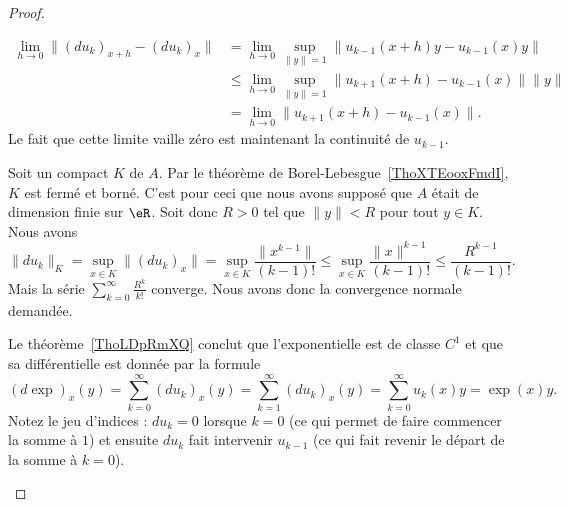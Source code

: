 \begin{proof}
\begin{subproof}
		\begin{subequations}
			\begin{align}
				\lim_{h\to 0} \| (du_k)_{x+h}-(du_k)_x \| & =\lim_{h\to 0} \sup_{\| y \|=1}\| u_{k-1}(x+h)y-u_{k-1}(x)y \|         \\
				                                          & \leq\lim_{h\to 0} \sup_{\| y \|=1}\| u_{k+1}(x+h)-u_{k-1}(x) \|\| y \| \\
				                                          & =\lim_{h\to 0} \| u_{k+1}(x+h)-u_{k-1}(x) \|.
			\end{align}
		\end{subequations}
		Le fait que cette limite vaille zéro est maintenant la continuité de \( u_{k-1}\).


		Soit un compact \( K\) de \( A\). Par le théorème de Borel-Lebesgue~\ref{ThoXTEooxFmdI}, \( K\) est fermé et borné. C'est pour ceci que nous avons supposé que \( A\) était de dimension finie sur \( \eR\). Soit donc \( R>0\) tel que \( \| y \|<R\) pour tout \( y\in K\). Nous avons
		\begin{equation}
			\| du_k \|_K=\sup_{x\in K}\| (du_k)_x \|=\sup_{x\in K}\frac{ \| x^{k-1} \| }{ (k-1)! }\leq \sup_{x\in K}\frac{ \| x \|^{k-1} }{ (k-1)! }\leq \frac{ R^{k-1} }{ (k-1)! }.
		\end{equation}
		Mais la série \( \sum_{k=0}^{\infty}\frac{ R^k }{k!}\) converge. Nous avons donc la convergence normale demandée.

		\spitem[Conclusion]

		Le théorème~\ref{ThoLDpRmXQ} conclut que l'exponentielle est de classe \( C^1\) et que sa différentielle est donnée par la formule
		\begin{equation}
			(d\exp)_x(y)=\sum_{k=0}^{\infty}(du_k)_x(y)=\sum_{k=1}^{\infty}(du_k)_x(y)=\sum_{k=0}^{\infty}u_k(x)y=\exp(x)y.
		\end{equation}
		Notez le jeu d'indices : \( du_k=0\) lorsque \( k=0\) (ce qui permet de faire commencer la somme à \( 1\)) et ensuite \( du_k\) fait intervenir \( u_{k-1}\) (ce qui fait revenir le départ de la somme à \( k=0\)).

	\end{subproof}
\end{proof}

